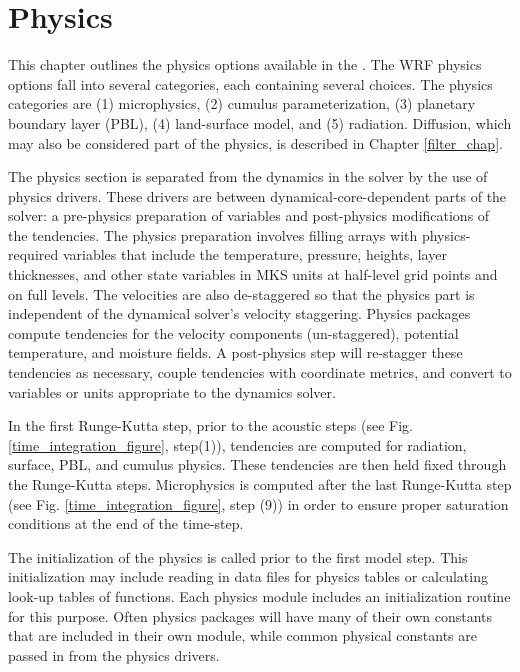 \chapter{Physics}
\label{physics_chap}

This chapter
outlines the physics options available in the {\wrf}. 
The WRF physics options fall into several categories, each containing
several choices. The physics categories are (1) microphysics, 
(2) cumulus parameterization, (3) planetary boundary layer (PBL), 
(4) land-surface model, and (5) radiation. Diffusion, which
may also be considered part of the physics, 
is described in Chapter \ref{filter_chap}. 

The physics section is separated from the dynamics in the solver by the 
use of physics drivers. These drivers are between dynamical-core-dependent parts
of the solver: a  pre-physics preparation of variables and post-physics 
modifications of the tendencies. The physics preparation involves filling
arrays with physics-required variables that include the temperature,
pressure, heights, layer thicknesses,
and other state variables in MKS units at half-level grid points and on full levels.
The velocities are also de-staggered so that the physics part is independent
of the dynamical solver's velocity staggering. Physics packages 
compute tendencies
for the velocity components (un-staggered), potential temperature, and moisture
fields. A post-physics step will re-stagger these tendencies
as necessary, couple tendencies with coordinate metrics, and convert
to variables or units appropriate to the dynamics solver.

In the first Runge-Kutta step, prior to the acoustic steps (see Fig.
\ref{time_integration_figure}, step(1)), tendencies are computed for
radiation, surface, PBL, and cumulus physics. These tendencies
are then held fixed through the Runge-Kutta steps. Microphysics is
computed after the last Runge-Kutta step 
(see Fig. \ref{time_integration_figure},
step (9)) in order to ensure proper saturation conditions at the end 
of the time-step.

The initialization of the physics is
called prior to the first model step. This initialization may include reading
in data files for physics tables or calculating look-up tables of functions.
Each physics module includes an initialization routine for this purpose.
Often physics packages will have many of their own constants that are
included in their own module, while common physical constants are
passed in from the physics drivers.


